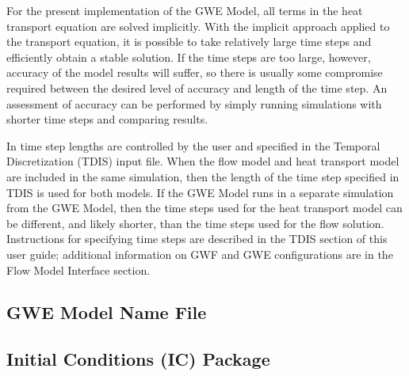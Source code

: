 For the present implementation of the GWE Model, all terms in the heat transport equation are solved implicitly.  With the implicit approach applied to the transport equation, it is possible to take relatively large time steps and efficiently obtain a stable solution.  If the time steps are too large, however, accuracy of the model results will suffer, so there is usually some compromise required between the desired level of accuracy and length of the time step.  An assessment of accuracy can be performed by simply running simulations with shorter time steps and comparing results.

In \mf time step lengths are controlled by the user and specified in the Temporal Discretization (TDIS) input file.  When the flow model and heat transport model are included in the same simulation, then the length of the time step specified in TDIS is used for both models.  If the GWE Model runs in a separate simulation from the GWE Model, then the time steps used for the heat transport model can be different, and likely shorter, than the time steps used for the flow solution.  Instructions for specifying time steps are described in the TDIS section of this user guide; additional information on GWF and GWE configurations are in the Flow Model Interface section.  



\newpage
\subsection{GWE Model Name File}


%

%

%

\newpage
\subsection{Initial Conditions (IC) Package}



